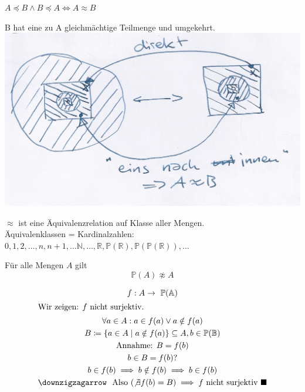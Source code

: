 \begin{satz*}[note = {(Schnöder, Bernstein, Cantor)}]
	$A \preceq B \wedge B \preceq A \iff A \approx B$\\
	\begin{bew}[note = ''Beweis'':]
		B hat eine zu A gleichmächtige Teilmenge und umgekehrt.\\
		\includegraphics[width=\textwidth]{Bild24}
	\end{bew}
\end{satz*}
\begin{def*}[note = Gleichmächtigkeit , index = Gleichmächtigkeit]
	$\approx$ ist eine Äquivalenzrelation auf Klasse aller Mengen.\\
	Äquivalenklassen = Kardinalzahlen:\\
	$0, 1, 2, \dotsc , n, n+1, \dotsc \mathbb{N}, \dotsc , \mathbb{R}, \mathbb{P}(\mathbb{R}), \mathbb{P}(\mathbb{P}(\mathbb{R})), \dotsc$
\end{def*}
\begin{satz*}[note = (Cantor)]
	Für alle Mengen $A$ gilt\\
	\[ \mathbb{P}(A) \not\approx A \]
	\begin{bew}
		\begin{gather*}
			f: A \rightarrow \mathbb{P}(\mathbb{A}) \\
			\intertext{Wir zeigen: $f$ nicht surjektiv.}
			\forall a \in A : a \in f(a) \vee a \notin f(a) \\
			B \coloneqq \{ a \in A \mid a \notin f(a) \} \subseteq A, b \in \mathbb{P}(\mathbb{B}) \\
			\text{Annahme: } B = f(b) \\
				b \in B = f(b) ? \\
				b \in f(b) \implies b\notin f(b) \implies b \in f(b) \\
				\text{\lightning ~ Also } ( \not\exists f(b) = B ) \implies f \text{ nicht surjektiv } \blacksquare
		\end{gather*}
	\end{bew}
\end{satz*}
